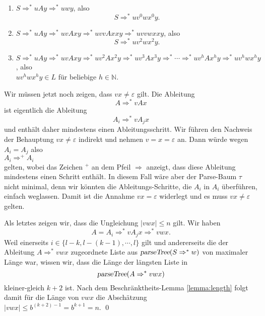 \begin{enumerate}
\item $S \Rightarrow^* uAy \Rightarrow^* uwy$, also
      \[ S \Rightarrow^* uv^0wx^0y. \]
\item $S \Rightarrow^* uAy \Rightarrow^* uvAxy \Rightarrow^* uvvAxxy \Rightarrow^* uvvwxxy$, also
      \[ S \Rightarrow^* uv^2wx^2y. \]
\item $S \Rightarrow^* uAy \Rightarrow^* uvAxy \Rightarrow^* uv^2Ax^2y \Rightarrow^* uv^3Ax^3y
       \Rightarrow^* \cdots \Rightarrow^* uv^hAx^hy \Rightarrow^* uv^hwx^hy$, also
      \\[0.2cm]
      \hspace*{1.3cm}
      $uv^hwx^hy \in L$ \quad f\"ur beliebige $h \in \mathbb{N}$.
      \vspace*{0.2cm}

\end{enumerate}
Wir m\"ussen jetzt noch zeigen, dass $vx \not= \varepsilon$ gilt.  Die Ableitung
\[ A \Rightarrow^* vAx \]
ist eigentlich die Ableitung
\[ A_i \Rightarrow^* vA_jx \]
und enth\"alt daher mindestens einen Ableitungsschritt.
Wir f\"uhren den Nachweis der Behauptung $vx \not= \varepsilon$ indirekt und nehmen $v = x =
\varepsilon$ an.
Dann w\"urde wegen $A_i = A_j$ also
\\[0.2cm]
\hspace*{1.3cm}
$A_i \Rightarrow^+ A_i$
\\[0.2cm]
gelten, wobei das Zeichen $^+$ an dem Pfeil $\Rightarrow$ anzeigt, dass diese Ableitung
mindestens einen Schritt 
enth\"alt.  In diesem Fall w\"are aber der Parse-Baum $\tau$ nicht minimal, denn wir k\"onnten
die Ableitungs-Schritte, die $A_i$ in $A_i$ \"uberf\"uhren, einfach weglassen.
Damit ist die Annahme $vx = \varepsilon$ widerlegt und es muss $vx \not= \varepsilon$ gelten.
\vspace*{0.2cm}

Als letztes zeigen wir, dass die Ungleichung $|vwx| \leq n$ gilt.  Wir haben
\[ A = A_i \Rightarrow^* vA_jx \Rightarrow^* vwx. \]
Weil einerseits $i \in \{l-k, l-(k-1), \cdots,l \}$ gilt und andererseits die der
Ableitung
$A \Rightarrow^* vwx$ zugeordnete Liste aus $\textsl{parseTree}(S \Rightarrow^* w)$ von
maximaler L\"ange war, wissen wir, 
dass die L\"ange der l\"angsten Liste in 
\[ \textsl{parseTree}(A \Rightarrow^* vwx) \]
kleiner-gleich  $k+2$ ist.
  Nach dem Beschr\"anktheits-Lemma
\ref{lemma:length} folgt damit f\"ur die L\"ange von $vwx$ die Absch\"atzung
\\[0.2cm]
\hspace*{1.3cm}
$|vwx| \leq b^{(k+2)-1} = b^{k+1} = n$.   \qed


